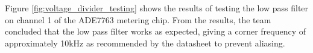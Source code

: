 Figure \ref{fig:voltage_divider_testing} shows the results of testing the low pass filter on channel 1 of the ADE7763 metering chip. From the results, the team concluded that the low pass filter works as expected, giving a corner frequency of approximately 10kHz as recommended by the datasheet \cite{ADE7763} to prevent aliasing. 


